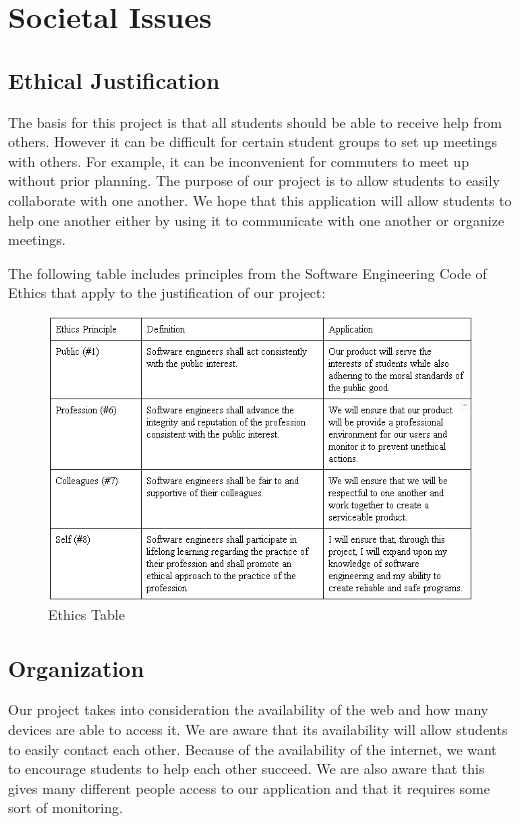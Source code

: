 \chapter{Societal Issues}

\section{Ethical Justification}
The basis for this project is that all students should be able to receive help from others. However it can be difficult for certain student groups to set up meetings with others. For example, it can be inconvenient for commuters to meet up without prior planning. The purpose of our project is to allow students to easily collaborate with one another. We hope that this application will allow students to help one another either by using it to communicate with one another or organize meetings.

The following table includes principles from the Software Engineering Code of Ethics that apply to the justification of our project:

\begin{figure}[h]
	\centering
	\includegraphics[scale=0.75]{images/ethics_table.png}
	\caption{Ethics Table}
	\label{fig:ethics table}
\end{figure}

\section{Organization}
Our project takes into consideration the availability of the web and how many devices are able to access it. We are aware that its availability will allow students to easily contact each other. Because of the availability of the internet, we want to encourage students to help each other succeed. We are also aware that this gives many different people access to our application and that it requires some sort of monitoring. 

